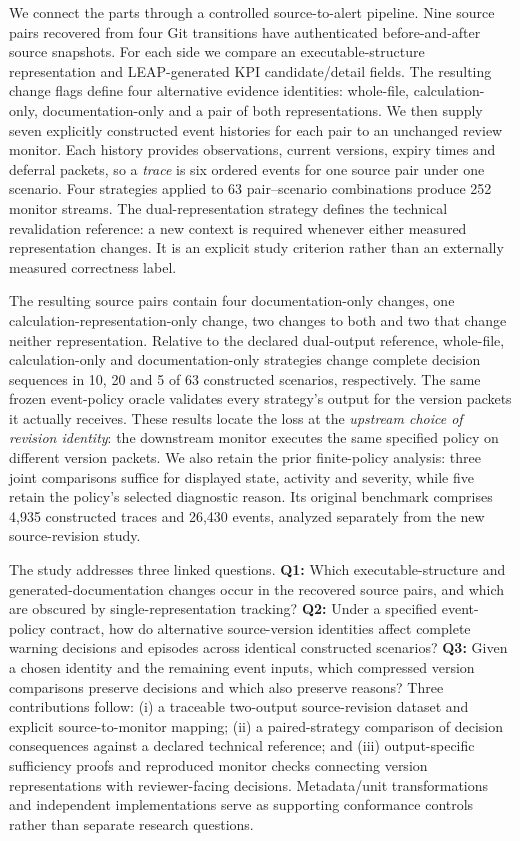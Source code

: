 \documentclass[preprint,11pt]{elsarticle}
\begin{document}
We connect the parts through a controlled source-to-alert pipeline. Nine source pairs recovered from four Git transitions have authenticated before-and-after source snapshots. For each side we compare an executable-structure representation and LEAP-generated KPI candidate/detail fields. The resulting change flags define four alternative evidence identities: whole-file, calculation-only, documentation-only and a pair of both representations. We then supply seven explicitly constructed event histories for each pair to an unchanged review monitor. Each history provides observations, current versions, expiry times and deferral packets, so a \emph{trace} is six ordered events for one source pair under one scenario. Four strategies applied to 63 pair--scenario combinations produce 252 monitor streams. The dual-representation strategy defines the technical revalidation reference: a new context is required whenever either measured representation changes. It is an explicit study criterion rather than an externally measured correctness label.

The resulting source pairs contain four documentation-only changes, one calculation-representation-only change, two changes to both and two that change neither representation. Relative to the declared dual-output reference, whole-file, calculation-only and documentation-only strategies change complete decision sequences in 10, 20 and 5 of 63 constructed scenarios, respectively. The same frozen event-policy oracle validates every strategy's output for the version packets it actually receives. These results locate the loss at the \emph{upstream choice of revision identity}: the downstream monitor executes the same specified policy on different version packets. We also retain the prior finite-policy analysis: three joint comparisons suffice for displayed state, activity and severity, while five retain the policy's selected diagnostic reason. Its original benchmark comprises 4,935 constructed traces and 26,430 events, analyzed separately from the new source-revision study.

The study addresses three linked questions. \textbf{Q1:} Which executable-structure and generated-documentation changes occur in the recovered source pairs, and which are obscured by single-representation tracking? \textbf{Q2:} Under a specified event-policy contract, how do alternative source-version identities affect complete warning decisions and episodes across identical constructed scenarios? \textbf{Q3:} Given a chosen identity and the remaining event inputs, which compressed version comparisons preserve decisions and which also preserve reasons? Three contributions follow: (i) a traceable two-output source-revision dataset and explicit source-to-monitor mapping; (ii) a paired-strategy comparison of decision consequences against a declared technical reference; and (iii) output-specific sufficiency proofs and reproduced monitor checks connecting version representations with reviewer-facing decisions. Metadata/unit transformations and independent implementations serve as supporting conformance controls rather than separate research questions.
\end{document}
